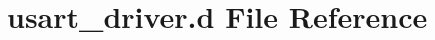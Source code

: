 \hypertarget{usart__driver_8d}{}\section{usart\+\_\+driver.\+d File Reference}
\label{usart__driver_8d}
